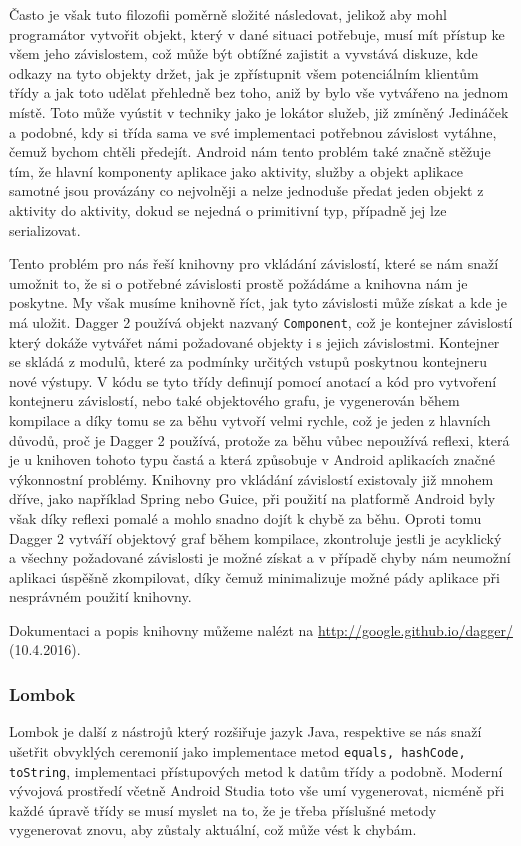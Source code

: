 \documentclass[czech,master,public,dept460,male,java,cpdeclaration]{diploma}
\begin{document}
Často je však tuto filozofii poměrně složité následovat, jelikož aby mohl programátor vytvořit objekt, který
v dané situaci potřebuje, musí mít přístup ke všem jeho závislostem, což může být obtížné zajistit
a vyvstává diskuze, kde odkazy na tyto objekty držet, jak je zpřístupnit všem potenciálním klientům třídy
a jak toto udělat přehledně bez toho, aniž by bylo vše vytvářeno na jednom místě. Toto může vyústit v techniky
jako je lokátor služeb, již zmíněný Jedináček a podobné, kdy si třída sama ve své implementaci potřebnou
závislost vytáhne, čemuž bychom chtěli předejít.
Android nám tento problém také značně stěžuje tím, že hlavní komponenty aplikace jako aktivity, služby a objekt
aplikace samotné jsou provázány co nejvolněji a nelze jednoduše předat jeden objekt z aktivity do aktivity,
dokud se nejedná o primitivní typ, případně jej lze serializovat.

Tento problém pro nás řeší knihovny pro vkládání závislostí, které se nám snaží umožnit to, že si o potřebné
závislosti prostě požádáme a knihovna nám je poskytne. My však musíme knihovně říct, jak tyto závislosti může
získat a kde je má uložit. Dagger 2 používá objekt nazvaný \texttt{Component}, což je kontejner závislostí
který dokáže vytvářet námi požadované objekty i s jejich závislostmi. Kontejner se skládá z modulů, které
za podmínky určitých vstupů poskytnou kontejneru nové výstupy. V kódu se tyto třídy definují pomocí anotací
a kód pro vytvoření kontejneru závislostí, nebo také objektového grafu, je vygenerován během kompilace
a díky tomu se za běhu vytvoří velmi rychle, což je jeden z hlavních důvodů, proč je Dagger 2 používá,
protože za běhu vůbec nepoužívá reflexi, která je u knihoven tohoto typu častá a která způsobuje v Android
aplikacích značné výkonnostní problémy. Knihovny pro vkládání závislostí existovaly již mnohem dříve,
jako například Spring nebo Guice, při použití na platformě Android byly však díky reflexi pomalé a mohlo snadno
dojít k chybě za běhu. Oproti tomu Dagger 2 vytváří objektový graf během kompilace, zkontroluje jestli je acyklický a
všechny požadované závislosti je možné získat a v případě chyby nám neumožní aplikaci úspěšně zkompilovat,
díky čemuž minimalizuje možné pády aplikace při nesprávném použití knihovny.

Dokumentaci a popis knihovny můžeme nalézt na \url{http://google.github.io/dagger/} (10.4.2016).

\subsubsection{Lombok}
Lombok je další z nástrojů který rozšiřuje jazyk Java, respektive se nás snaží ušetřit obvyklých
ceremonií jako implementace metod \texttt{equals, hashCode, toString}, implementaci přístupových
metod k datům třídy a podobně. Moderní vývojová prostředí včetně Android Studia toto vše umí
vygenerovat, nicméně při každé úpravě třídy se musí myslet na to, že je třeba příslušné metody
vygenerovat znovu, aby zůstaly aktuální, což může vést k chybám.
\end{document}
